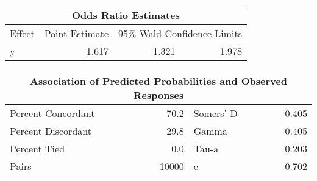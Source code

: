 \documentclass[10pt]{article}
\begin{document}


\begin{longtable}{|l|r|r|r|}\hline
   \multicolumn{4}{|c|}{Odds Ratio Estimates}\\\hline
   Effect &    Point Estimate &    \multicolumn{2}{|c|}{95\% Wald {\newline}  Confidence Limits}\\\hline
\endhead
   y &    1.617 &    1.321 &    1.978\\\hline
\end{longtable}



\begin{longtable}{|l|r|l|r|}\hline
   \multicolumn{4}{|c|}{Association of Predicted Probabilities and Observed Responses}\\\hline
\endhead
   Percent Concordant &    70.2 &    Somers' D &    0.405\\\hline
   Percent Discordant &    29.8 &    Gamma &    0.405\\\hline
   Percent Tied &    0.0 &    Tau-a &    0.203\\\hline
   Pairs &    10000 &    c &    0.702\\\hline
\end{longtable}

\end{document}

